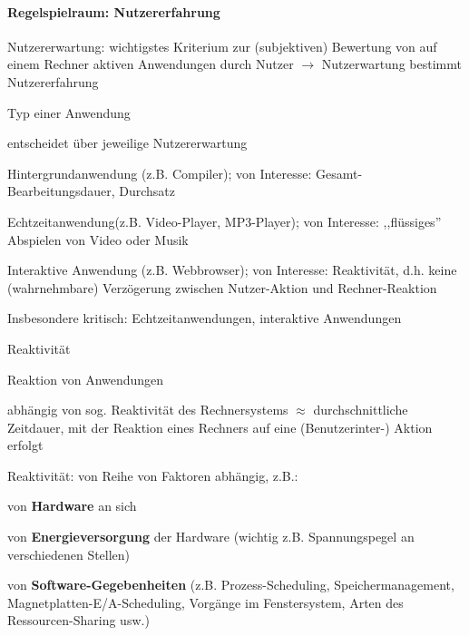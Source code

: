 \documentclass[a4paper]{article}
\begin{document}
\begin{multicols}{3}
    \paragraph{Regelspielraum:
        Nutzererfahrung}

    \begin{itemize*}
        \item
        Nutzererwartung: wichtigstes Kriterium zur (subjektiven) Bewertung von
        auf einem Rechner aktiven Anwendungen durch Nutzer
        $\rightarrow$  Nutzerwartung bestimmt Nutzererfahrung
        \item
        Typ einer Anwendung
        \begin{itemize*}
            \item entscheidet über jeweilige Nutzererwartung \begin{enumerate*}  \item   Hintergrundanwendung (z.B. Compiler); von Interesse:   Gesamt-Bearbeitungsdauer, Durchsatz \item   Echtzeitanwendung(z.B. Video-Player, MP3-Player); von Interesse:   ,,flüssiges'' Abspielen von Video oder Musik \item   Interaktive Anwendung (z.B. Webbrowser); von Interesse:   Reaktivität, d.h. keine (wahrnehmbare) Verzögerung zwischen   Nutzer-Aktion und Rechner-Reaktion \end{enumerate*}
            \item Insbesondere kritisch: Echtzeitanwendungen, interaktive Anwendungen
        \end{itemize*}
    \end{itemize*}

    Reaktivität

    \begin{itemize*}
        \item
        Reaktion von Anwendungen
        \begin{itemize*}
            \item abhängig von sog. Reaktivität des Rechnersystems $\approx$ durchschnittliche Zeitdauer, mit der Reaktion eines Rechners auf eine (Benutzerinter-) Aktion erfolgt
        \end{itemize*}
        \item
        Reaktivität: von Reihe von Faktoren abhängig, z.B.:
        \begin{enumerate*}

            \item von \textbf{Hardware} an sich
            \item von \textbf{Energieversorgung} der Hardware (wichtig z.B. Spannungspegel an verschiedenen Stellen)
            \item von \textbf{Software-Gegebenheiten} (z.B. Prozess-Scheduling, Speichermanagement, Magnetplatten-E/A-Scheduling, Vorgänge im Fenstersystem, Arten des Ressourcen-Sharing usw.)
        \end{enumerate*}
    \end{itemize*}


\end{multicols}
\end{document}
